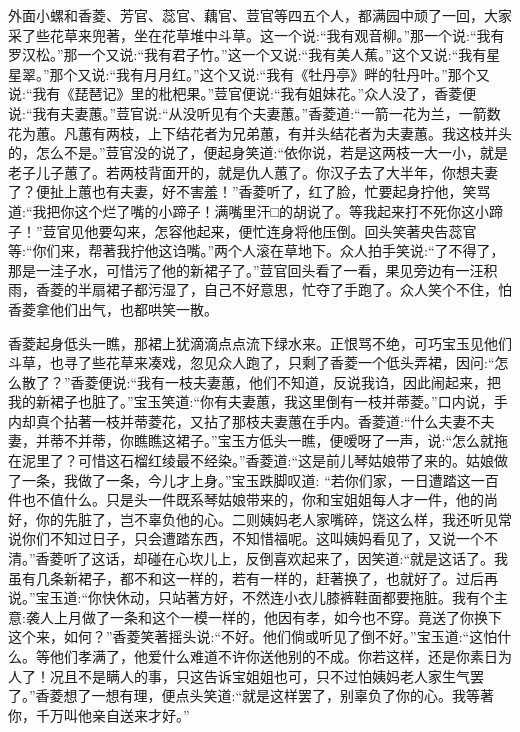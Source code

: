 \begin{parag}
    外面小螺和香菱、芳官、蕊官、藕官、荳官等四五个人，都满园中顽了一回，大家采了些花草来兜著，坐在花草堆中斗草。这一个说:“我有观音柳。”那一个说:“我有罗汉松。”那一个又说:“我有君子竹。”这一个又说:“我有美人蕉。”这个又说:“我有星星翠。”那个又说:“我有月月红。”这个又说:“我有《牡丹亭》畔的牡丹叶。”那个又说:“我有《琵琶记》里的枇杷果。”荳官便说:“我有姐妹花。”众人没了，香菱便说:“我有夫妻蕙。”荳官说:“从没听见有个夫妻蕙。”香菱道:“一箭一花为兰，一箭数花为蕙。凡蕙有两枝，上下结花者为兄弟蕙，有并头结花者为夫妻蕙。我这枝并头的，怎么不是。”荳官没的说了，便起身笑道:“依你说，若是这两枝一大一小，就是老子儿子蕙了。若两枝背面开的，就是仇人蕙了。你汉子去了大半年，你想夫妻了？便扯上蕙也有夫妻，好不害羞！”香菱听了，红了脸，忙要起身拧他，笑骂道:“我把你这个烂了嘴的小蹄子！满嘴里汗□的胡说了。等我起来打不死你这小蹄子！”荳官见他要勾来，怎容他起来，便忙连身将他压倒。回头笑著央告蕊官等:“你们来，帮著我拧他这诌嘴。”两个人滚在草地下。众人拍手笑说:“了不得了，那是一洼子水，可惜污了他的新裙子了。”荳官回头看了一看，果见旁边有一汪积雨，香菱的半扇裙子都污湿了，自己不好意思，忙夺了手跑了。众人笑个不住，怕香菱拿他们出气，也都哄笑一散。
\end{parag}


\begin{parag}
    香菱起身低头一瞧，那裙上犹滴滴点点流下绿水来。正恨骂不绝，可巧宝玉见他们斗草，也寻了些花草来凑戏，忽见众人跑了，只剩了香菱一个低头弄裙，因问:“怎么散了？”香菱便说:“我有一枝夫妻蕙，他们不知道，反说我诌，因此闹起来，把我的新裙子也脏了。”宝玉笑道:“你有夫妻蕙，我这里倒有一枝并蒂菱。”口内说，手内却真个拈著一枝并蒂菱花，又拈了那枝夫妻蕙在手内。香菱道:“什么夫妻不夫妻，并蒂不并蒂，你瞧瞧这裙子。”宝玉方低头一瞧，便嗳呀了一声，说:“怎么就拖在泥里了？可惜这石榴红绫最不经染。”香菱道:“这是前儿琴姑娘带了来的。姑娘做了一条，我做了一条，今儿才上身。”宝玉跌脚叹道: “若你们家，一日遭踏这一百件也不值什么。只是头一件既系琴姑娘带来的，你和宝姐姐每人才一件，他的尚好，你的先脏了，岂不辜负他的心。二则姨妈老人家嘴碎，饶这么样，我还听见常说你们不知过日子，只会遭踏东西，不知惜福呢。这叫姨妈看见了，又说一个不清。”香菱听了这话，却碰在心坎儿上，反倒喜欢起来了，因笑道:“就是这话了。我虽有几条新裙子，都不和这一样的，若有一样的，赶著换了，也就好了。过后再说。”宝玉道:“你快休动，只站著方好，不然连小衣儿膝裤鞋面都要拖脏。我有个主意:袭人上月做了一条和这个一模一样的，他因有孝，如今也不穿。竟送了你换下这个来，如何？”香菱笑著摇头说:“不好。他们倘或听见了倒不好。”宝玉道:“这怕什么。等他们孝满了，他爱什么难道不许你送他别的不成。你若这样，还是你素日为人了！况且不是瞒人的事，只这告诉宝姐姐也可，只不过怕姨妈老人家生气罢了。”香菱想了一想有理，便点头笑道:“就是这样罢了，别辜负了你的心。我等著你，千万叫他亲自送来才好。”
\end{parag}


